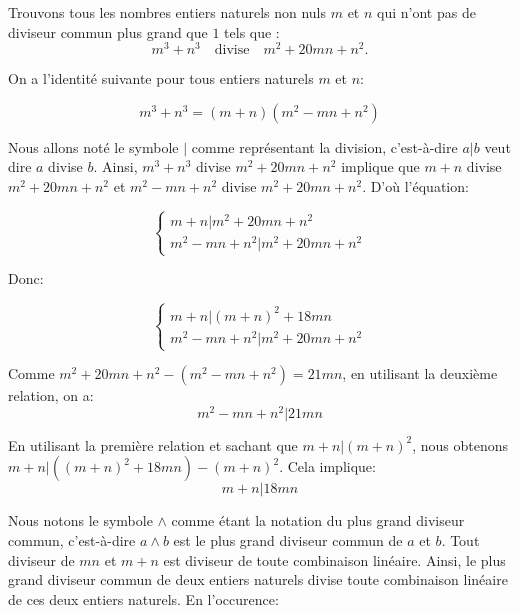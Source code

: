 \documentclass[12pt,a4paper,article]{memoir}
\begin{document}
Trouvons tous les nombres entiers naturels non nuls $m$ et $n$ qui n'ont pas de diviseur commun plus grand que $1$ tels que :
\begin{equation}
m^3 + n^3 \quad \textrm{divise} \quad m^2 + 20mn + n^2.
\label{equation-pb-2-sol-1}
\end{equation}

\bigskip

On a l'identité suivante pour tous entiers naturels $m$ et $n$:

\begin{equation}
m^3 + n^3 = (m+n)(m^2-mn+n^2)
\label{equation-factor-sum-cube}
\end{equation}

Nous allons noté le symbole $|$ comme représentant la division, c'est-à-dire $a|b$ veut dire $a$ divise $b$.
Ainsi, $m^3 + n^3$ divise $m^2+20mn+n^2$ implique que $m+n$ divise $m^2+20mn+n^2$ et $m^2-mn+n^2$ divise $m^2+20mn+n^2$. D'où l'équation:

\[\left\{
	\begin{array}{l}
	m+n | m^2+20mn+n^2 \\
	m^2-mn+n^2 | m^2+20mn+n^2
	\end{array}
\right.\]

Donc:

\[\left\{
	\begin{array}{l}
	m+n | (m+n)^2 + 18mn \\
	m^2-mn+n^2 | m^2+20mn+n^2
	\end{array}
\right.\]

Comme $m^2+20mn+n^2 - (m^2-mn+n^2) = 21mn$, en utilisant la deuxième relation, on a:
\begin{equation}
m^2-mn+n^2 | 21mn
\label{equation-divise-vgtun-prod}
\end{equation}

En utilisant la première relation et sachant que $m + n | (m + n)^2$, nous obtenons $m+n | ((m+n)^2 + 18mn) - (m+n)^2$. Cela implique:
\begin{equation}
m+n | 18mn
\label{equation-divise-sum-prod}
\end{equation}

Nous notons le symbole $\land$ comme étant la notation du plus grand diviseur commun, c'est-à-dire $a \land b$ est le plus grand diviseur commun de $a$ et $b$. Tout diviseur de $mn$ et $m+n$ est diviseur de toute combinaison linéaire. Ainsi, le plus grand diviseur commun de deux entiers naturels divise toute combinaison linéaire de ces deux entiers naturels. En l'occurence:
\end{document}
